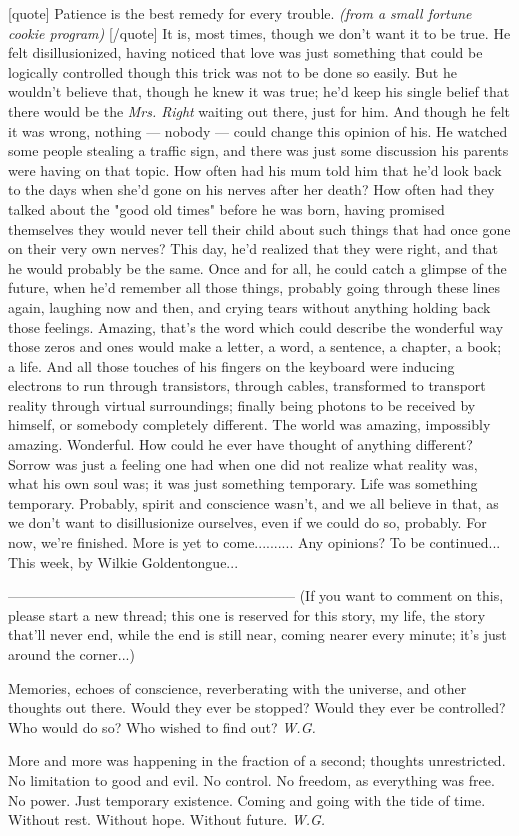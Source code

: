 [quote]
Patience is the best remedy for every trouble. 
\emph{(from a small fortune cookie program)}
[/quote]
It is, most times, though we don't want it to be true. 
He felt disillusionized, having noticed that love was just something that could be logically controlled though this trick was not to be done so easily. But he wouldn't believe that, though he knew it was true; he'd keep his single belief that there would be the \emph{Mrs. Right} waiting out there, just for him. And though he felt it was wrong, nothing --- nobody --- could change this opinion of his. 
He watched some people stealing a traffic sign, and there was just some discussion his parents were having on that topic. How often had his mum told him that he'd look back to the days when she'd gone on his nerves after her death? How often had they talked about the "good old times" before he was born, having promised themselves they would never tell their child about such things that had once gone on their very own nerves?
This day, he'd realized that they were right, and that he would probably be the same. Once and for all, he could catch a glimpse of the future, when he'd remember all those things, probably going through these lines again, laughing now and then, and crying tears without anything holding back those feelings. Amazing, that's the word which could describe the wonderful way those zeros and ones would make a letter, a word, a sentence, a chapter, a book; a life. 
And all those touches of his fingers on the keyboard were inducing electrons to run through transistors, through cables, transformed to transport reality through virtual surroundings; finally being photons to be received by himself, or somebody completely different. 
The world was amazing, impossibly amazing. Wonderful. How could he ever have thought of anything different? Sorrow was just a feeling one had when one did not realize what reality was, what his own soul was; it was just something temporary. 
Life was something temporary. 
Probably, spirit and conscience wasn't, and we all believe in that, as we don't want to disillusionize ourselves, even if we could do so, probably. 
For now, we're finished. 
More is yet to come..........
Any opinions?
To be continued...
This week, by Wilkie Goldentongue...

--------------------------------------------------------------
(If you want to comment on this, please start a new thread; this one is reserved for this story, my life, the story that'll never end, while the end is still near, coming nearer every minute; it's just around the corner...)

Memories, 
echoes of conscience, 
reverberating with the universe, 
and other thoughts 
out there. 
Would they ever be stopped? 
Would they ever be controlled? 
Who would do so? 
Who wished to find out? 
\emph{W.G.}

More and more 
was happening in the fraction 
of a second; 
thoughts unrestricted. 
No limitation 
to good and evil. 
No control. 
No freedom, 
as everything was free. 
No power. 
Just temporary 
existence. 
Coming and going 
with the tide of time. 
Without rest. 
Without hope. 
Without future. 
\emph{W.G.}
